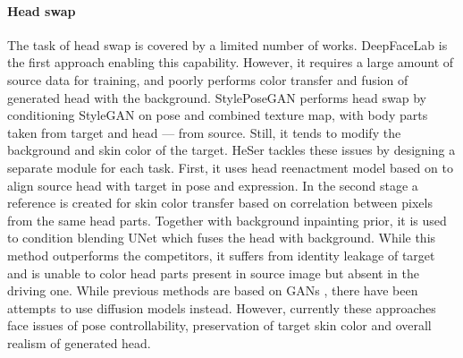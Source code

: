 \paragraph{Head swap}
The task of head swap is covered by a limited number of works. DeepFaceLab \cite{perov2020deepfacelab} is the first approach enabling this capability. However, it requires a large amount of source data for training, and poorly performs color transfer and fusion of generated head with the background. StylePoseGAN \cite{sarkar2021style} performs head swap by conditioning StyleGAN \cite{Karras2019stylegan2} on pose and combined texture map, with body parts taken from target and head — from source. 
Still, it tends to modify the background and skin color of the target. HeSer \cite{shu2022few} tackles these issues by designing a separate module for each task. First, it uses head reenactment model based on \cite{Burkov_2020_CVPR} to align source head with target in pose and expression. In the second stage a reference is created for skin color transfer based on correlation between pixels from the same head parts. Together with background inpainting prior, it is used to condition blending UNet \cite{ronneberger2015u} which fuses the head with background. While this method outperforms the competitors, it suffers from identity leakage of target and is unable to color head parts present in source image but absent in the driving one.  
While previous methods are based on GANs \cite{goodfellow2014generative}, there have been attempts \cite{wang2022hs, han2023generalist} to use diffusion models \cite{ho2020denoising} instead. However, currently these approaches face issues of pose controllability, preservation of target skin color and overall realism of generated head.


\vspace{-8pt}
